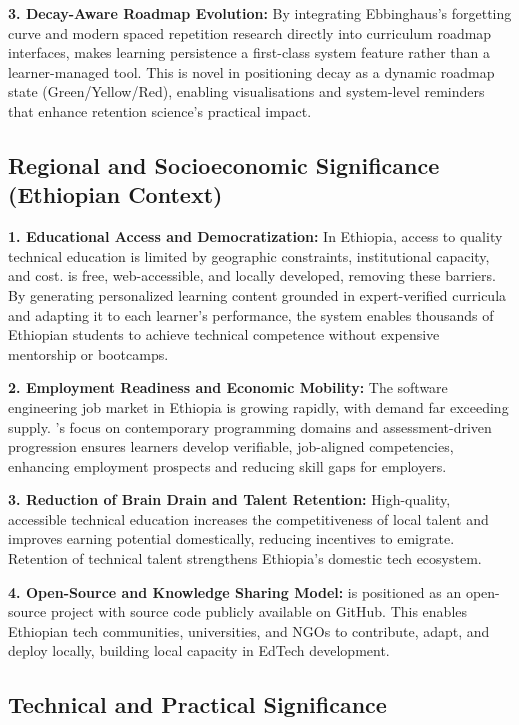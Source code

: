 \textbf{3. Decay-Aware Roadmap Evolution:} By integrating Ebbinghaus's forgetting curve and modern spaced repetition research directly into curriculum roadmap interfaces, \projectname{} makes learning persistence a first-class system feature rather than a learner-managed tool. This is novel in positioning decay as a dynamic roadmap state (Green/Yellow/Red), enabling visualisations and system-level reminders that enhance retention science's practical impact.

\subsection{Regional and Socioeconomic Significance (Ethiopian Context)}

\textbf{1. Educational Access and Democratization:} In Ethiopia, access to quality technical education is limited by geographic constraints, institutional capacity, and cost. \projectname{} is free, web-accessible, and locally developed, removing these barriers. By generating personalized learning content grounded in expert-verified curricula and adapting it to each learner's performance, the system enables thousands of Ethiopian students to achieve technical competence without expensive mentorship or bootcamps.

\textbf{2. Employment Readiness and Economic Mobility:} The software engineering job market in Ethiopia is growing rapidly, with demand far exceeding supply. \projectname's focus on contemporary programming domains and assessment-driven progression ensures learners develop verifiable, job-aligned competencies, enhancing employment prospects and reducing skill gaps for employers.

\textbf{3. Reduction of Brain Drain and Talent Retention:} High-quality, accessible technical education increases the competitiveness of local talent and improves earning potential domestically, reducing incentives to emigrate. Retention of technical talent strengthens Ethiopia's domestic tech ecosystem.

\textbf{4. Open-Source and Knowledge Sharing Model:} \projectname{} is positioned as an open-source project with source code publicly available on GitHub. This enables Ethiopian tech communities, universities, and NGOs to contribute, adapt, and deploy locally, building local capacity in EdTech development.

\subsection{Technical and Practical Significance}


